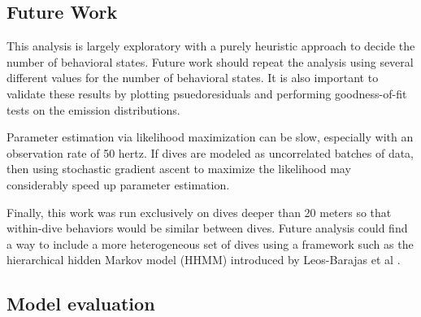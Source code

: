 \subsection{Future Work}

This analysis is largely exploratory with a purely heuristic approach to decide the number of behavioral states. Future work should repeat the analysis using several different values for the number of behavioral states. It is also important to validate these results by plotting psuedoresiduals and performing goodness-of-fit tests on the emission distributions.

Parameter estimation via likelihood maximization can be slow, especially with an observation rate of 50 hertz. If dives are modeled as uncorrelated batches of data, then using stochastic gradient ascent to maximize the likelihood may considerably speed up parameter estimation.

Finally, this work was run exclusively on dives deeper than 20 meters so that within-dive behaviors would be similar between dives. Future analysis could find a way to include a more heterogeneous set of dives using a framework such as the hierarchical hidden Markov model (HHMM) introduced by Leos-Barajas et al \cite{Barajas:2017}.

\subsection{Model evaluation}

